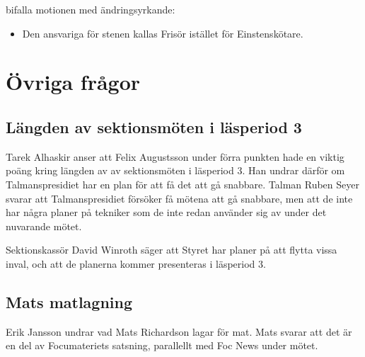 \documentclass[hidelinks]{sektionsmote} %
\begin{document}
\begin{beslut}
  \item bifalla motionen med ändringsyrkande:
  \begin{itemize}
    \item Den ansvariga för stenen kallas Frisör istället för Einstenskötare.
  \end{itemize}
\end{beslut}

\section{Övriga frågor}
\subsection{Längden av sektionsmöten i läsperiod 3}
Tarek Alhaskir anser att Felix Augustsson under förra punkten hade en viktig poäng kring längden av av sektionsmöten i läsperiod 3.
Han undrar därför om Talmanspresidiet har en plan för att få det att gå snabbare.
Talman Ruben Seyer svarar att Talmanspresidiet försöker få mötena att gå snabbare, men att de inte har några planer på tekniker som de inte redan använder sig av under det nuvarande mötet.\par
Sektionskassör David Winroth säger att Styret har planer på att flytta vissa inval, och att de planerna kommer presenteras i läsperiod 3.

\subsection{Mats matlagning}
Erik Jansson undrar vad Mats Richardson lagar för mat.
Mats svarar att det är en del av Focumateriets satsning, parallellt med Foc News under mötet.
\end{document}
